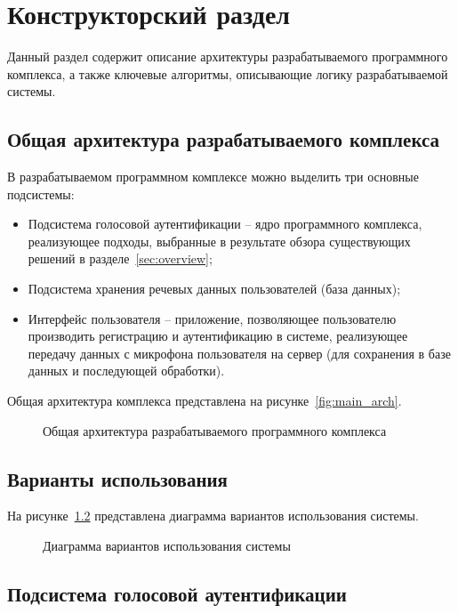 \chapter{Конструкторский раздел}
Данный раздел содержит описание архитектуры разрабатываемого программного комплекса, а также ключевые алгоритмы, описывающие логику разрабатываемой системы.

\section{Общая архитектура разрабатываемого комплекса}
\label{sec:main_arch}

В разрабатываемом программном комплексе можно выделить три основные подсистемы:
\begin{itemize}
\item Подсистема голосовой аутентификации -- ядро программного комплекса, реализующее подходы, выбранные в результате обзора существующих решений в разделе~\ref{sec:overview};
\item Подсистема хранения речевых данных пользователей (база данных);
\item Интерфейс пользователя -- приложение, позволяющее пользователю производить регистрацию и аутентификацию в системе, реализующее передачу данных с микрофона пользователя на сервер (для сохранения в базе данных и последующей обработки).
\end{itemize}

Общая архитектура комплекса представлена на рисунке~\ref{fig:main_arch}.

\begin{figure}
    \caption{Общая архитектура разрабатываемого программного комплекса}
    \label{fig:}
\end{figure}

\section{Варианты использования}

На рисунке~\ref{fig:use_cases} представлена диаграмма вариантов использования системы.

\begin{figure}[htp!]
    \caption{Диаграмма вариантов использования системы}
    \label{fig:use_cases}
\end{figure}

\section{Подсистема голосовой аутентификации}

